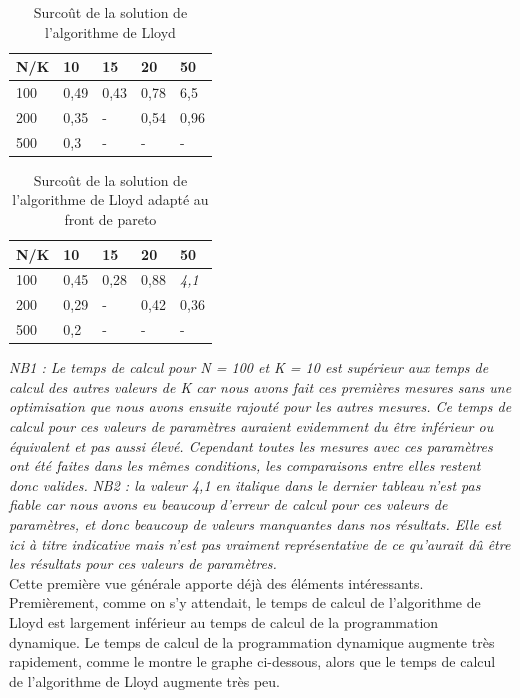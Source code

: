﻿\documentclass{meta}
\begin{document}
{\newpage

\begin{table}[]
\centering
\begin{tabular}{|l|l|l|l|l|}
\hline
N/K & 10   & 15   & 20   & 50   \\ \hline
100 & 0,49 & 0,43 & 0,78 & 6,5  \\ \hline
200 & 0,35 & -    & 0,54 & 0,96 \\ \hline
500 & 0,3  & -    & -    & -    \\ \hline
\end{tabular}
\caption{Surcoût de la solution de l'algorithme de Lloyd}
\label{tab:my-table}
\end{table}

\begin{table}[]
\centering
\begin{tabular}{|l|l|l|l|l|}
\hline
N/K & 10   & 15   & 20   & 50   \\ \hline
100 & 0,45 & 0,28 & 0,88 & \textit{4,1}  \\ \hline
200 & 0,29 & -    & 0,42 & 0,36 \\ \hline
500 & 0,2  & -    & -    & -    \\ \hline
\end{tabular}
\caption{Surcoût de la solution de l'algorithme de Lloyd adapté au front de pareto}
\label{tab:my-table}
\end{table}

\textit{NB1 : Le temps de calcul pour N = 100 et K = 10 est supérieur aux temps de calcul des autres valeurs de K car nous avons fait ces premières mesures sans une optimisation que nous avons ensuite rajouté pour les autres mesures. Ce temps de calcul pour ces valeurs de paramètres auraient evidemment du être inférieur ou équivalent et pas aussi élevé. Cependant toutes les mesures avec ces paramètres ont été faites dans les mêmes conditions, les comparaisons entre elles restent donc valides.}
\textit{NB2 : la valeur 4,1 en italique dans le dernier tableau n'est pas fiable car nous avons eu beaucoup d'erreur de calcul pour ces valeurs de paramètres, et donc beaucoup de valeurs manquantes dans nos résultats. Elle est ici à titre indicative mais n'est pas vraiment représentative de ce qu'aurait dû être les résultats pour ces valeurs de paramètres.} \\

Cette première vue générale apporte déjà des éléments intéressants.\\
Premièrement, comme on s'y attendait, le temps de calcul de l'algorithme de Lloyd est largement inférieur au temps de calcul de la programmation dynamique. Le temps de calcul de la programmation dynamique augmente très rapidement, comme le montre le graphe ci-dessous, alors que le temps de calcul de l'algorithme de Lloyd augmente très peu. \\

}
\end{document}
